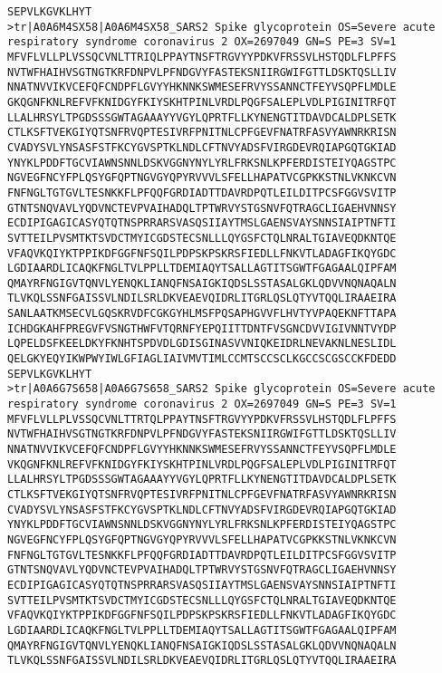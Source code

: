 \begin{lstlisting}
SEPVLKGVKLHYT
>tr|A0A6M4SX58|A0A6M4SX58_SARS2 Spike glycoprotein OS=Severe acute respiratory syndrome coronavirus 2 OX=2697049 GN=S PE=3 SV=1
MFVFLVLLPLVSSQCVNLTTRIQLPPAYTNSFTRGVYYPDKVFRSSVLHSTQDLFLPFFS
NVTWFHAIHVSGTNGTKRFDNPVLPFNDGVYFASTEKSNIIRGWIFGTTLDSKTQSLLIV
NNATNVVIKVCEFQFCNDPFLGVYYHKNNKSWMESEFRVYSSANNCTFEYVSQPFLMDLE
GKQGNFKNLREFVFKNIDGYFKIYSKHTPINLVRDLPQGFSALEPLVDLPIGINITRFQT
LLALHRSYLTPGDSSSGWTAGAAAYYVGYLQPRTFLLKYNENGTITDAVDCALDPLSETK
CTLKSFTVEKGIYQTSNFRVQPTESIVRFPNITNLCPFGEVFNATRFASVYAWNRKRISN
CVADYSVLYNSASFSTFKCYGVSPTKLNDLCFTNVYADSFVIRGDEVRQIAPGQTGKIAD
YNYKLPDDFTGCVIAWNSNNLDSKVGGNYNYLYRLFRKSNLKPFERDISTEIYQAGSTPC
NGVEGFNCYFPLQSYGFQPTNGVGYQPYRVVVLSFELLHAPATVCGPKKSTNLVKNKCVN
FNFNGLTGTGVLTESNKKFLPFQQFGRDIADTTDAVRDPQTLEILDITPCSFGGVSVITP
GTNTSNQVAVLYQDVNCTEVPVAIHADQLTPTWRVYSTGSNVFQTRAGCLIGAEHVNNSY
ECDIPIGAGICASYQTQTNSPRRARSVASQSIIAYTMSLGAENSVAYSNNSIAIPTNFTI
SVTTEILPVSMTKTSVDCTMYICGDSTECSNLLLQYGSFCTQLNRALTGIAVEQDKNTQE
VFAQVKQIYKTPPIKDFGGFNFSQILPDPSKPSKRSFIEDLLFNKVTLADAGFIKQYGDC
LGDIAARDLICAQKFNGLTVLPPLLTDEMIAQYTSALLAGTITSGWTFGAGAALQIPFAM
QMAYRFNGIGVTQNVLYENQKLIANQFNSAIGKIQDSLSSTASALGKLQDVVNQNAQALN
TLVKQLSSNFGAISSVLNDILSRLDKVEAEVQIDRLITGRLQSLQTYVTQQLIRAAEIRA
SANLAATKMSECVLGQSKRVDFCGKGYHLMSFPQSAPHGVVFLHVTYVPAQEKNFTTAPA
ICHDGKAHFPREGVFVSNGTHWFVTQRNFYEPQIITTDNTFVSGNCDVVIGIVNNTVYDP
LQPELDSFKEELDKYFKNHTSPDVDLGDISGINASVVNIQKEIDRLNEVAKNLNESLIDL
QELGKYEQYIKWPWYIWLGFIAGLIAIVMVTIMLCCMTSCCSCLKGCCSCGSCCKFDEDD
SEPVLKGVKLHYT
>tr|A0A6G7S658|A0A6G7S658_SARS2 Spike glycoprotein OS=Severe acute respiratory syndrome coronavirus 2 OX=2697049 GN=S PE=3 SV=1
MFVFLVLLPLVSSQCVNLTTRTQLPPAYTNSFTRGVYYPDKVFRSSVLHSTQDLFLPFFS
NVTWFHAIHVSGTNGTKRFDNPVLPFNDGVYFASTEKSNIIRGWIFGTTLDSKTQSLLIV
NNATNVVIKVCEFQFCNDPFLGVYYHKNNKSWMESEFRVYSSANNCTFEYVSQPFLMDLE
VKQGNFKNLREFVFKNIDGYFKIYSKHTPINLVRDLPQGFSALEPLVDLPIGINITRFQT
LLALHRSYLTPGDSSSGWTAGAAAYYVGYLQPRTFLLKYNENGTITDAVDCALDPLSETK
CTLKSFTVEKGIYQTSNFRVQPTESIVRFPNITNLCPFGEVFNATRFASVYAWNRKRISN
CVADYSVLYNSASFSTFKCYGVSPTKLNDLCFTNVYADSFVIRGDEVRQIAPGQTGKIAD
YNYKLPDDFTGCVIAWNSNNLDSKVGGNYNYLYRLFRKSNLKPFERDISTEIYQAGSTPC
NGVEGFNCYFPLQSYGFQPTNGVGYQPYRVVVLSFELLHAPATVCGPKKSTNLVKNKCVN
FNFNGLTGTGVLTESNKKFLPFQQFGRDIADTTDAVRDPQTLEILDITPCSFGGVSVITP
GTNTSNQVAVLYQDVNCTEVPVAIHADQLTPTWRVYSTGSNVFQTRAGCLIGAEHVNNSY
ECDIPIGAGICASYQTQTNSPRRARSVASQSIIAYTMSLGAENSVAYSNNSIAIPTNFTI
SVTTEILPVSMTKTSVDCTMYICGDSTECSNLLLQYGSFCTQLNRALTGIAVEQDKNTQE
VFAQVKQIYKTPPIKDFGGFNFSQILPDPSKPSKRSFIEDLLFNKVTLADAGFIKQYGDC
LGDIAARDLICAQKFNGLTVLPPLLTDEMIAQYTSALLAGTITSGWTFGAGAALQIPFAM
QMAYRFNGIGVTQNVLYENQKLIANQFNSAIGKIQDSLSSTASALGKLQDVVNQNAQALN
TLVKQLSSNFGAISSVLNDILSRLDKVEAEVQIDRLITGRLQSLQTYVTQQLIRAAEIRA

\end{lstlisting}
